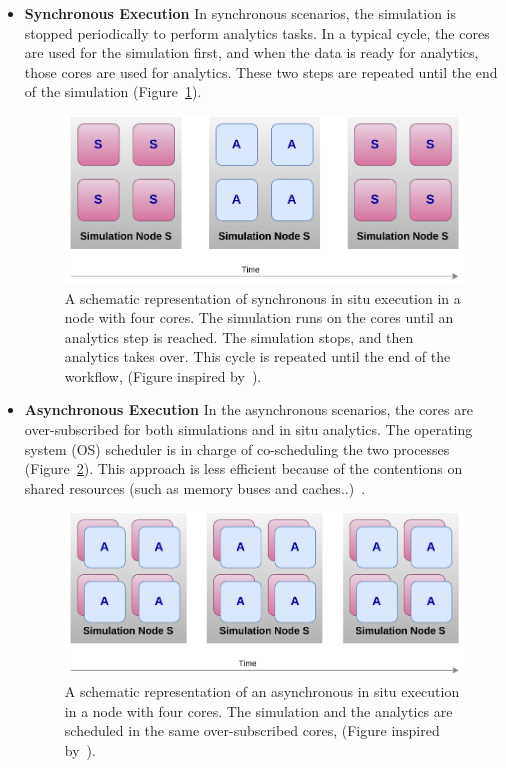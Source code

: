 \begin{itemize}
    \item \textbf{Synchronous Execution}
    In synchronous scenarios, the simulation is stopped periodically to perform analytics tasks. In a typical cycle, the cores are used for the simulation first, and when the data is ready for analytics, those cores are used for analytics. These two steps are repeated until the end of the simulation (Figure~\ref{figinsitusynch}).
    
    \begin{figure}[tb]\centering
    \includegraphics[scale=0.9]{figures/insitu_synchronous.pdf}
    \caption{A schematic representation of synchronous in situ execution in a node with four cores. The simulation runs on the cores until an analytics step is reached. The simulation stops, and then analytics takes over. This cycle is repeated until the end of the workflow, (Figure inspired by~\cite{Estelle_integration_2018}).}
    \label{figinsitusynch}
    \end{figure}


    \item \textbf{Asynchronous Execution}
    In the asynchronous scenarios, the cores are over-subscribed for both simulations and in situ analytics. The operating system (OS) scheduler is in charge of co-scheduling the two processes (Figure~\ref{figinsituasynch}). This approach is less efficient because of the contentions on shared resources (such as memory buses and caches..)~\cite{zheng2013goldrush, Estelle_integration_2018}. 

    \begin{figure}[tb]\centering
    \includegraphics[scale=0.9]{figures/insitu_asynch.pdf}
    \caption{A schematic representation of an asynchronous in situ execution in a node with four cores. The simulation and the analytics are scheduled in the same over-subscribed cores, (Figure inspired by~\cite{Estelle_integration_2018}).}
    \label{figinsituasynch}
    \end{figure}


\end{itemize}
